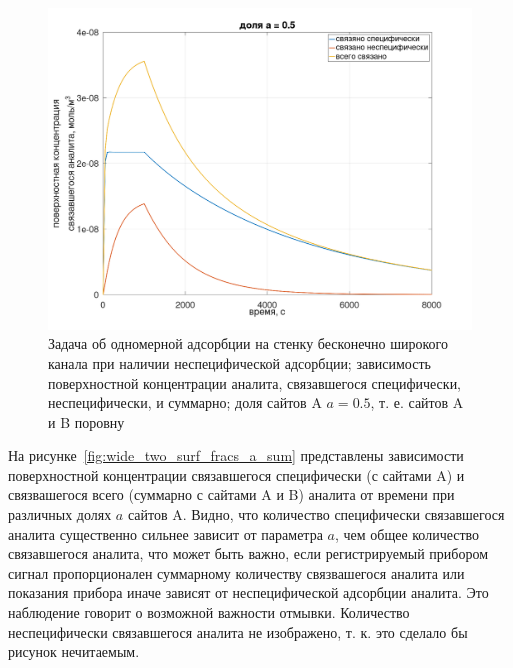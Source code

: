 \documentclass[oneside,final,12pt]{extreport}
\begin{document}
\begin{figure}
  \centering
  \includegraphics[width=.7\textwidth]{pic/flat_wide_twosurf_example}

  \caption{%
    \label{fig:flat_wide_two_surf_example}%
    Задача об одномерной адсорбции на стенку бесконечно широкого канала
    при наличии неспецифической адсорбции;
    зависимость поверхностной концентрации аналита,
    связавшегося специфически, неспецифически, и суммарно;
    доля сайтов A $a = 0.5$, т. е. сайтов A и B поровну
  }

\end{figure}

На рисунке~\ref{fig:wide_two_surf_fracs_a_sum} представлены зависимости
поверхностной концентрации связавшегося специфически (с сайтами A) и
связвашегося всего (суммарно с сайтами A и B)
аналита от времени при различных долях $a$ сайтов A.
Видно, что количество специфически связавшегося аналита существенно сильнее
зависит от параметра $a$, чем общее количество связавшегося аналита,
что может быть важно, если регистрируемый прибором сигнал пропорционален
суммарному количеству связвашегося аналита или
показания прибора иначе зависят от неспецифической адсорбции аналита.
Это наблюдение говорит о возможной важности отмывки.
Количество неспецифически связавшегося аналита не изображено,
т. к. это сделало бы рисунок нечитаемым.
\end{document}
